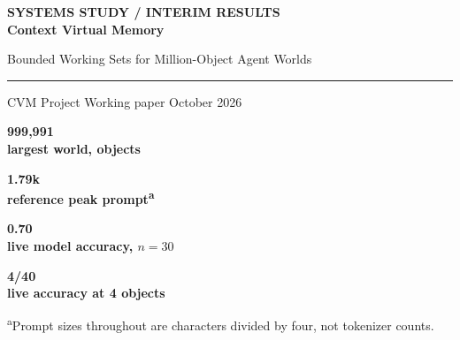 \documentclass[10pt,letterpaper]{article}
\newcommand{\stat}[2]{\begin{minipage}[t]{0.23\linewidth}\centering\sffamily\color{teal}\fontsize{18}{20}\selectfont\bfseries #1\\[-1pt]\color{muted}\fontsize{8}{10}\selectfont #2\end{minipage}}
\newcommand{\cvm}{\textsc{CVM}}
\begin{document}
\thispagestyle{empty}
\vspace*{0.36in}
{\sffamily\bfseries\small\color{teal}\MakeUppercase{Systems study \quad / \quad Interim results}}\\[0.19in]
{\sffamily\bfseries\fontsize{29}{34}\selectfont\color{ink} Context Virtual Memory}\par
{\sffamily\fontsize{17}{23}\selectfont\color{blue} Bounded Working Sets for Million-Object Agent Worlds}\par
\vspace{0.14in}
{\color{rulegray}\rule{\linewidth}{0.7pt}}\par
{\sffamily\small\color{muted} CVM Project \hfill Working paper \;\textbullet{} October 2026}\par
\vspace{0.14in}

\begin{abstract}
\noindent Agents need to investigate large external worlds without placing those worlds in the model prompt. We study \emph{Context Virtual Memory} (\cvm), a runtime that gives a model stable object handles, explicit page faults, bounded resident objects, durable notes, and evidence-checked answers. In a synthetic incident world growing from 112 to 999,991 objects, a deterministic prompt-only policy solves 90/90 tasks at each size while its mean peak resident set remains 8.1--9.4 objects and its estimated peak prompt remains 1.55--1.79k tokens. A live DeepSeek-V4.1-Flash processor solves 21/30 tasks at the largest size with 12.3 resident objects and a 1.97k-token estimated mean peak. A controlled reference-policy ablation shows that notes permit perfect accuracy with two resident objects; without notes, two-object accuracy is zero and re-fetching reaches 96\%. In a separate live-model test at one million objects, reducing residency from 32 to four objects lowers DeepSeek accuracy from 27/40 to 4/40, accompanied by 59\% re-fetching. We also report an interim Qwen2.5-7B-Instruct adapter: 252/256 exact actions on held-out trajectory states after 203 training steps, and a single successful end-to-end serving pilot. These results establish the behavior of this prototype and motivate larger paired model evaluations; they do not establish general world-size invariance or task-level improvement from fine-tuning.
\end{abstract}

\vspace{0.12in}
\colorbox{pale}{\parbox{\dimexpr\linewidth-2\fboxsep\relax}{\vspace{0.13in}
\stat{999,991}{largest world, objects}\hfill
\stat{1.79k}{reference peak prompt\textsuperscript{a}}\hfill
\stat{0.70}{live model accuracy, $n=30$}\hfill
\stat{4/40}{live accuracy at 4 objects}
\vspace{0.12in}}}\par
{\footnotesize\color{muted}\textsuperscript{a}Prompt sizes throughout are characters divided by four, not tokenizer counts.}
\end{document}
